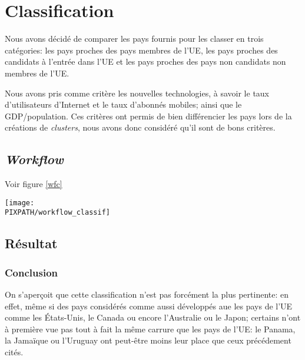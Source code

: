 \vfil
\pagebreak
\section{Classification}

Nous avons décidé de comparer les pays fournis pour
les classer en trois catégories: les pays proches des pays
membres de l'UE, les pays proches des candidats à l'entrée
dans l'UE et les pays proches des pays non candidats non
membres de l'UE.

Nous avons pris comme critère les nouvelles technologies, à savoir
le taux d'utilisateurs d'Internet et le taux d'abonnés mobiles; ainsi
que le GDP/population.
Ces critères ont permis de bien différencier les pays lors de la
créations de {\sl clusters}, nous avons donc considéré qu'il
sont de bons critères.

\subsection{{\sl Workflow}}
Voir figure \ref{wfc}

\begin{sidewaysfigure}[!h]
\begin{center}
    \caption{{\sl Workflow} classification}
    \texttt{[image: \\PIXPATH/workflow\_classif]}
\label{wfc}
\end{center}
\end{sidewaysfigure}


\subsection{Résultat}



\subsubsection{Conclusion}

On s'aperçoit que cette classification n'est pas forcément
la plus pertinente: en effet, même si des pays considérés comme
aussi développés aue les pays de l'UE comme les États-Unis, le Canada
ou encore l'Australie ou le Japon; certains n'ont à première vue pas
tout à fait la même carrure que les pays de l'UE: le Panama, la Jamaïque
ou l'Uruguay ont peut-être moins leur place que ceux précédement cités. 
